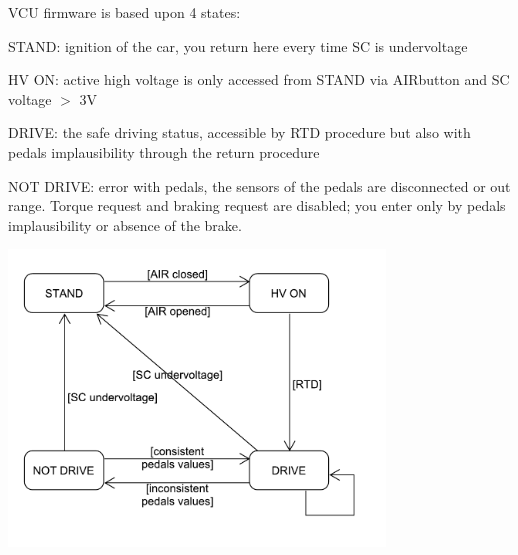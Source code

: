 V\+CU firmware is based upon 4 states\+:
\begin{DoxyItemize}
\item \label{_f_s_m_STAND}%
%
S\+T\+A\+ND\+: ignition of the car, you return here every time SC is undervoltage
\item \label{_f_s_m_HVON}%
%
HV ON\+: active high voltage is only accessed from S\+T\+A\+ND via A\+I\+Rbutton and SC voltage $>$ 3V
\item \label{_f_s_m_DRIVE}%
%
D\+R\+I\+VE\+: the safe driving status, accessible by R\+TD procedure but also with pedals implausibility through the return procedure
\item \label{_f_s_m_NOTDRIVE}%
%
N\+OT D\+R\+I\+VE\+: error with pedals, the sensors of the pedals are disconnected or out range. Torque request and braking request are disabled; you enter only by pedals implausibility or absence of the brake.
\end{DoxyItemize}

 
\begin{DoxyImage}
\includegraphics[width=10cm]{fsm_diagram}
\end{DoxyImage}
 